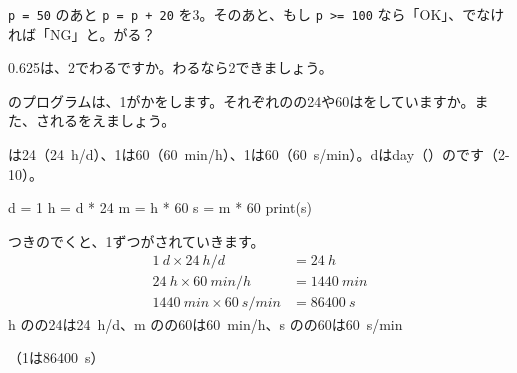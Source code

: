 \begingroup{}%
\noindent\begin{minipage}[t]{0.49\linewidth}
\begin{jibun}
\texttt{p = 50} のあと \texttt{p = p + 20} を3。そのあと、もし \texttt{p >= 100} なら「OK」、でなければ「NG」と。がる？
\end{jibun}
\end{minipage}\hfill
\begin{minipage}[t]{0.49\linewidth}
\begin{jibun}
0.625は、2でわるですか。わるなら2できましょう。
\end{jibun}
\end{minipage}\par
\endgroup


\begin{reidai}[\R{単位}{たん|い}の\R{換算}{かん|さん}をプログラムで]
\noindent\begin{minipage}[t]{0.6\linewidth}
のプログラムは、1がかをします。それぞれのの24や60はをしていますか。また、されるをえましょう。\par
{}は24（\qty{24}{h/d}）、1は60（\qty{60}{min/h}）、1は60（\qty{60}{s/min}）。dはday（）のです（2-10）。
\end{minipage}\hfill
\begin{minipage}[t]{0.36\linewidth}
\vspace{2pt}
\begin{bkiitcode}
d = 1
h = d * 24
m = h * 60
s = m * 60
print(s)
\end{bkiitcode}
\end{minipage}\par
\shiki {}つきのでくと、1ずつがされていきます。
\begin{align*}
\qty{1}{d}\times\qty{24}{h/d}&=\qty{24}{h}\\
\qty{24}{h}\times\qty{60}{min/h}&=\qty{1440}{min}\\
\qty{1440}{min}\times\qty{60}{s/min}&=\qty{86400}{s}
\end{align*}
\hspace*{2.6\zw}h のの24は\qty{24}{h/d}、m のの60は\qty{60}{min/h}、s のの60は\qty{60}{s/min}\par
{}（1は\qty{86400}{s}）
\end{reidai}

